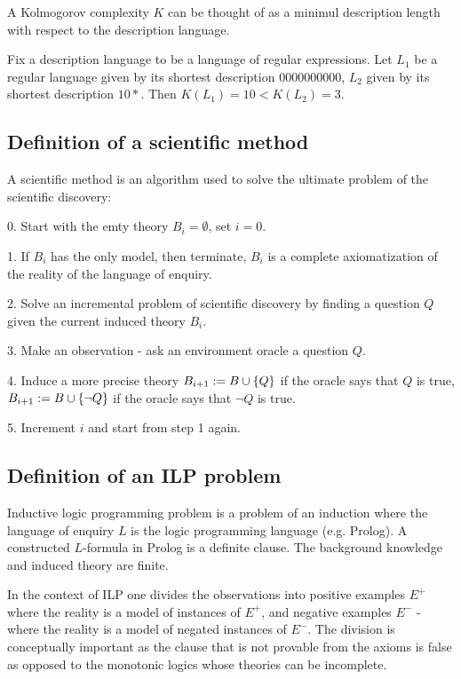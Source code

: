 \begin{note}
A Kolmogorov complexity $K$ can be thought of as a minimul description length with respect to the description language.
\end{note}
\begin{exmp}
Fix a description language to be a language of regular expressions. Let $L_1$ be a regular language given by its shortest description $0000000000$, $L_2$ given by its shortest description $10*$. Then $K(L_1)=10<K(L_2)=3$.
\end{exmp}

\subsection{Definition of a scientific method}
A scientific method is an algorithm used to solve the ultimate problem of the scientific discovery:

0. Start with the emty theory $B_i=\emptyset$, set $i=0$.

1. If $B_i$ has the only model, then terminate, $B_i$ is a complete axiomatization of the reality of the language of enquiry.

2. Solve an incremental problem of scientific discovery by finding a question $Q$ given the current induced theory $B_i$.

3. Make an observation - ask an environment oracle a question $Q$.

4. Induce a more precise theory $B_{i+1}:=B \cup \{Q\}$ if the oracle says that $Q$ is true, $B_{i+1}:=B \cup \{\neg Q\}$ if the oracle says that $\neg Q$ is true.

5. Increment $i$ and start from step 1 again.

\subsection{Definition of an ILP problem}
Inductive logic programming problem is a problem of an induction where the language of enquiry $L$ is the logic programming language (e.g. Prolog). A constructed $L$-formula in Prolog is a definite clause. The background knowledge and induced theory are finite.

In the context of ILP one divides the observations into positive examples $E^+$ where the reality is a model of instances of $E^+$, and negative examples $E^-$ - where the reality is a model of negated instances of $E^-$. The division is conceptually important as the clause that is not provable from the axioms is false as opposed to the monotonic logics whose theories can be incomplete.

